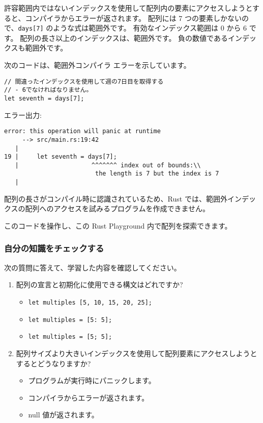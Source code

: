 許容範囲内ではないインデックスを使用して配列内の要素にアクセスしようとすると、コンパイラからエラーが返されます。 配列には 7 つの要素しかないので、\texttt{days[7]} のような式は範囲外です。 有効なインデックス範囲は 0 から 6 です。 配列の長さ以上のインデックスは、範囲外です。 負の数値であるインデックスも範囲外です。

次のコードは、範囲外コンパイラ エラーを示しています。


\begin{lstlisting}[numbers=none]
// 間違ったインデックスを使用して週の7日目を取得する
// - 6でなければなりません。
let seventh = days[7];
\end{lstlisting}

エラー出力:

\begin{lstlisting}[numbers=none]
    error: this operation will panic at runtime
     --> src/main.rs:19:42
   |
19 |     let seventh = days[7];
   |                    ^^^^^^^ index out of bounds:\\
                         the length is 7 but the index is 7
   |
\end{lstlisting}

配列の長さがコンパイル時に認識されているため、Rust では、範囲外インデックスの配列へのアクセスを試みるプログラムを作成できません。

このコードを操作し、この Rust Playground 内で配列を探索できます。

\subsubsection{自分の知識をチェックする}

次の質問に答えて、学習した内容を確認してください。

\begin{enumerate}
\item 配列の宣言と初期化に使用できる構文はどれですか?
\begin{itemize}
\item \texttt{let multiples [5, 10, 15, 20, 25];}

\item \texttt{let multiples = [5: 5];}

\item \texttt{let multiples = [5; 5];}
\end{itemize}

\item 配列サイズより大きいインデックスを使用して配列要素にアクセスしようとするとどうなりますか?
\begin{itemize}
\item プログラムが実行時にパニックします。

\item コンパイラからエラーが返されます。

\item null 値が返されます。
\end{itemize}

\end{enumerate}
